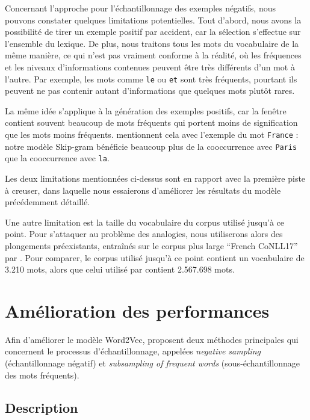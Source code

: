 \documentclass[12pt]{article}
\begin{document}
Concernant l'approche pour l'échantillonnage des exemples négatifs, nous pouvons constater quelques limitations potentielles. Tout d'abord, nous avons la possibilité de tirer un exemple positif par accident, car la sélection s'effectue sur l'ensemble du lexique. De plus, nous traitons tous les mots du vocabulaire de la même manière, ce qui n'est pas vraiment conforme à la réalité, où les fréquences et les niveaux d'informations contenues peuvent être très différents d'un mot à l'autre. Par exemple, les mots comme \texttt{le} ou \texttt{et} sont très fréquents, pourtant ils peuvent ne pas contenir autant d'informations que quelques mots plutôt rares. 

La même idée s'applique à la génération des exemples positifs, car la fenêtre contient souvent beaucoup de mots fréquents qui portent moins de signification que les mots moins fréquents. \cite{DBLP:conf/nips/MikolovSCCD13} mentionnent cela avec l'exemple du mot \texttt{France} : notre modèle Skip-gram bénéficie beaucoup plus de la cooccurrence avec \texttt{Paris} que la cooccurrence avec \texttt{la}. 

Les deux limitations mentionnées ci-dessus sont en rapport avec la première piste à creuser, dans laquelle nous essaierons d'améliorer les résultats du modèle précédemment détaillé.  

Une autre limitation est la taille du vocabulaire du corpus utilisé jusqu'à ce point. Pour s'attaquer au problème des analogies, nous utiliserons alors des plongements préexistants, entraînés sur le corpus plus large ``French CoNLL17'' par \cite{fares-etal-2017-word}. Pour comparer, le corpus utilisé jusqu'à ce point contient un vocabulaire de 3.210 mots, alors que celui utilisé par \cite{fares-etal-2017-word} contient 2.567.698 mots.

\section{Amélioration des performances} \label{amélioration des performances}

Afin d'améliorer le modèle Word2Vec, \cite{DBLP:conf/nips/MikolovSCCD13} proposent deux méthodes principales qui concernent le processus d'échantillonnage, appelées \textit{negative sampling} (échantillonnage négatif) et \textit{subsampling of frequent words} (sous-échantillonnage des mots fréquents). 

\subsection{Description} \label{description-1}
\end{document}
